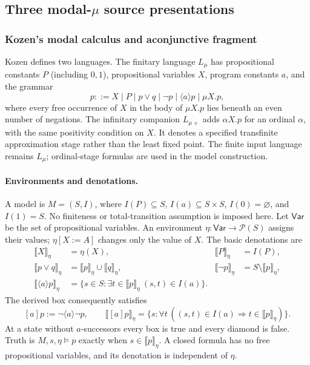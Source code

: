 
\subsection{Three modal-\(\mu\) source presentations}
\label{sec:p09-presentation-n-c-018}

\subsubsection{Kozen's modal calculus and aconjunctive fragment}
\label{sec:p09-n-c-018-kozen}

Kozen defines two languages. The finitary language \(L_\mu\) has
propositional constants \(P\) (including \(0,1\)), propositional variables
\(X\), program constants \(a\), and the grammar
\[
 p::=X\mid P\mid p\lor q\mid\neg p\mid
       \langle a\rangle p\mid\mu X.p,
\]
where every free occurrence of \(X\) in the body of \(\mu X.p\) lies beneath
an even number of negations.  The infinitary companion \(L_{\mu+}\) adds
\(\alpha X.p\) for an ordinal \(\alpha\), with the same positivity
condition on \(X\). It denotes a specified transfinite approximation
stage rather than the least fixed point. The finite input language
remains \(L_\mu\); ordinal-stage formulas are used in the model
construction.

\paragraph{Environments and denotations.}
A model is \(M=(S,I)\), where \(I(P)\subseteq S\),
\(I(a)\subseteq S\times S\), \(I(0)=\varnothing\), and \(I(1)=S\).
No finiteness or total-transition assumption is imposed here.
Let \(\mathsf{Var}\) be the set of propositional variables.
An environment \(\eta:\mathsf{Var}\to\mathcal P(S)\) assigns
their values; \(\eta[X:=A]\) changes only
the value of \(X\). The basic denotations are
\[
\begin{aligned}
 \llbracket X\rrbracket_\eta&=\eta(X),&
 \llbracket P\rrbracket_\eta&=I(P),\\
 \llbracket p\lor q\rrbracket_\eta
   &=\llbracket p\rrbracket_\eta\cup\llbracket q\rrbracket_\eta,&
 \llbracket\neg p\rrbracket_\eta
   &=S\setminus\llbracket p\rrbracket_\eta,\\
 \llbracket\langle a\rangle p\rrbracket_\eta
   &=\{s\in S:\exists t\in\llbracket p\rrbracket_\eta\
                         (s,t)\in I(a)\}.
\end{aligned}
\]
The derived box consequently satisfies
\[
 [a]p:=\neg\langle a\rangle\neg p,\qquad
 \llbracket[a]p\rrbracket_\eta
  =\{s:\forall t\,((s,t)\in I(a)\Rightarrow
                          t\in\llbracket p\rrbracket_\eta)\}.
\]
At a state without \(a\)-successors every box is true and
every diamond is false. Truth is
\(M,s,\eta\models p\) exactly when
\(s\in\llbracket p\rrbracket_\eta\). A closed formula has
no free propositional variables, and its denotation is
independent of \(\eta\).


